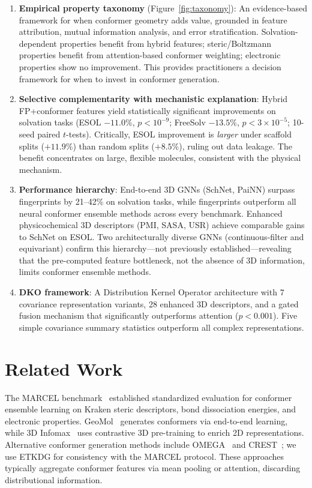 \documentclass[sigconf]{acmart}
\newcommand{\rev}[1]{#1}
\begin{document}
\begin{enumerate}
    \item \textbf{Empirical property taxonomy} (Figure~\ref{fig:taxonomy}): An evidence-based framework for when conformer geometry adds value, grounded in feature attribution, mutual information analysis, and error stratification. Solvation-dependent properties benefit from hybrid features; steric/Boltzmann properties benefit from attention-based conformer weighting; electronic properties show no improvement. This provides practitioners a decision framework for when to invest in conformer generation.
    \item \textbf{Selective complementarity with mechanistic explanation}: Hybrid FP+conformer features yield statistically significant improvements on solvation tasks (ESOL $-11.0\%$, $p < 10^{-9}$; FreeSolv $-13.5\%$, $p < 3 \times 10^{-5}$; 10-seed paired $t$-tests). Critically, ESOL improvement is \emph{larger} under scaffold splits ($+11.9\%$) than random splits ($+8.5\%$), ruling out data leakage. The benefit concentrates on large, flexible molecules, consistent with the physical mechanism.
    \item \rev{\textbf{Performance hierarchy}: End-to-end 3D GNNs (SchNet, PaiNN) surpass fingerprints by 21--42\% on solvation tasks, while fingerprints outperform all neural conformer ensemble methods across every benchmark. Enhanced physicochemical 3D descriptors (PMI, SASA, USR) achieve comparable gains to SchNet on ESOL. Two architecturally diverse GNNs (continuous-filter and equivariant) confirm this hierarchy---not previously established---revealing that the pre-computed feature bottleneck, not the absence of 3D information, limits conformer ensemble methods.}
    \item \textbf{DKO framework}: A Distribution Kernel Operator architecture with 7 covariance representation variants, 28 enhanced 3D descriptors, and a gated fusion mechanism that significantly outperforms attention ($p < 0.001$). Five simple covariance summary statistics outperform all complex representations.
\end{enumerate}

\section{Related Work}

The MARCEL benchmark~\cite{axelrod2024marcel} established standardized evaluation for conformer ensemble learning on Kraken steric descriptors, bond dissociation energies, and electronic properties.
GeoMol~\cite{ganea2021geomol} generates conformers via end-to-end learning, while 3D Infomax~\cite{stark2022equivariant} uses contrastive 3D pre-training to enrich 2D representations.
Alternative conformer generation methods include OMEGA~\cite{hawkins2010omega} and CREST~\cite{pracht2020crest}; we use ETKDG for consistency with the MARCEL protocol.
These approaches typically aggregate conformer features via mean pooling or attention, discarding distributional information.
\end{document}
